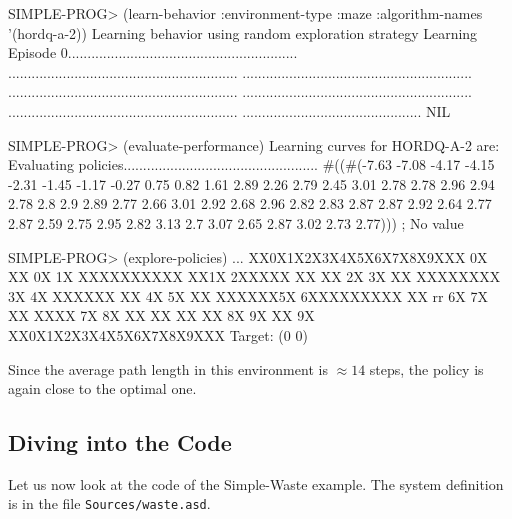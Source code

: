 \documentclass[a4paper]{amsart}
\begin{document}
\begin{Code}
  SIMPLE-PROG> (learn-behavior :environment-type :maze :algorithm-names '(hordq-a-2))
  Learning behavior using random exploration strategy
  Learning
  Episode
  0...........................................................
   ...........................................................
   ...........................................................
   ...........................................................
   ...........................................................
   ...........................................................
   ..............................................
  NIL

  SIMPLE-PROG> (evaluate-performance)  
  Learning curves for HORDQ-A-2 are:
  Evaluating policies..................................................
  #((#(-7.63 -7.08 -4.17 -4.15 -2.31 -1.45
       -1.17 -0.27 0.75 0.82 1.61 2.89
       2.26 2.79 2.45 3.01 2.78 2.78 2.96
       2.94 2.78 2.8 2.9 2.89 2.77 2.66
       3.01 2.92 2.68 2.96 2.82 2.83 2.87
       2.87 2.92 2.64 2.77 2.87 2.59 2.75
       2.95 2.82 3.13 2.7 3.07 2.65 2.87 3.02 2.73 2.77)))
  ; No value

  SIMPLE-PROG> (explore-policies)
  \lsq...\rsq
  XX0X1X2X3X4X5X6X7X8X9XXX
  0X      XX            0X
  1X      XXXXXXXXXX  XX1X
  2XXXXX  XX  XX        2X
  3X      XX  XXXXXXXX  3X
  4X  XXXXXX  XX        4X
  5X          XX  XXXXXX5X
  6XXXXXXXXX  XX    rr  6X
  7X  XX      XXXX      7X
  8X  XX  XX  XX  XX    8X
  9X      XX            9X
  XX0X1X2X3X4X5X6X7X8X9XXX
  Target: (0 0)
\end{Code}
Since the average path length in this environment is $\approx 14$
steps, the policy is again close to the optimal one.

\subsection{Diving into the Code}
\label{sec:diving-into-code}

Let us now look at the code of the Simple-Waste example.  The system
definition is in the file \texttt{Sources/waste.asd}.
\end{document}
